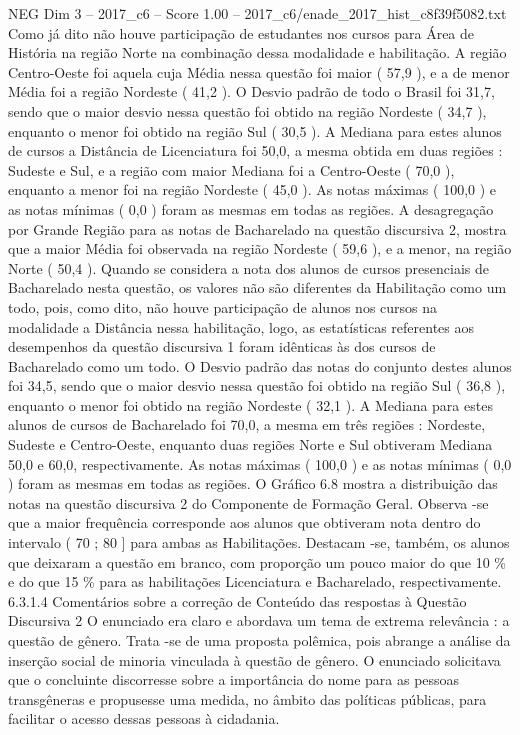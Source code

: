 \begin{textsample}{NEG Dim 3 – 2017\_c6 – Score 1.00 – 2017\_c6/enade\_2017\_hist\_c8f39f5082.txt}
Como já dito não houve participação de estudantes nos cursos para Área de História na região Norte na combinação dessa modalidade e habilitação.
A região Centro-Oeste foi aquela cuja Média nessa questão foi maior ( 57,9 ), e a de menor Média foi a região Nordeste ( 41,2 ).
O Desvio padrão de todo o Brasil foi 31,7, sendo que o maior desvio nessa questão foi obtido na região Nordeste ( 34,7 ), enquanto o menor foi obtido na região Sul ( 30,5 ).
A Mediana para estes alunos de cursos a Distância de Licenciatura foi 50,0, a mesma obtida em duas regiões : Sudeste e Sul, e a região com maior Mediana foi a Centro-Oeste ( 70,0 ), enquanto a menor foi na região Nordeste ( 45,0 ).
As notas máximas ( 100,0 ) e as notas mínimas ( 0,0 ) foram as mesmas em todas as regiões.
A desagregação por Grande Região para as notas de Bacharelado na questão discursiva 2, mostra que a maior Média foi observada na região Nordeste ( 59,6 ), e a menor, na região Norte ( 50,4 ).
Quando se considera a nota dos alunos de cursos presenciais de Bacharelado nesta questão, os valores não são diferentes da Habilitação como um todo, pois, como dito, não houve participação de alunos nos cursos na modalidade a Distância nessa habilitação, logo, as estatísticas referentes aos desempenhos da questão discursiva 1 foram idênticas às dos cursos de Bacharelado como um todo.
O Desvio padrão das notas do conjunto destes alunos foi 34,5, sendo que o maior desvio nessa questão foi obtido na região Sul ( 36,8 ), enquanto o menor foi obtido na região Nordeste ( 32,1 ).
A Mediana para estes alunos de cursos de Bacharelado foi 70,0, a mesma em três regiões : Nordeste, Sudeste e Centro-Oeste, enquanto duas regiões Norte e Sul obtiveram Mediana 50,0 e 60,0, respectivamente.
As notas máximas ( 100,0 ) e as notas mínimas ( 0,0 ) foram as mesmas em todas as regiões.
O Gráfico 6.8 mostra a distribuição das notas na questão discursiva 2 do Componente de Formação Geral.
Observa -se que a maior frequência corresponde aos alunos que obtiveram nota dentro do intervalo ( 70 ; 80 ] para ambas as Habilitações.
Destacam -se, também, os alunos que deixaram a questão em branco, com proporção um pouco maior do que 10 \% e do que 15 \% para as habilitações Licenciatura e Bacharelado, respectivamente. 6.3.1.4 Comentários sobre a correção de Conteúdo das respostas à Questão Discursiva 2 O enunciado era claro e abordava um tema de extrema relevância : a questão de gênero.
Trata -se de uma proposta polêmica, pois abrange a análise da inserção social de minoria vinculada à questão de gênero.
O enunciado solicitava que o concluinte discorresse sobre a importância do nome para as pessoas transgêneras e propusesse uma medida, no âmbito das políticas públicas, para facilitar o acesso dessas pessoas à cidadania.

\end{textsample}
